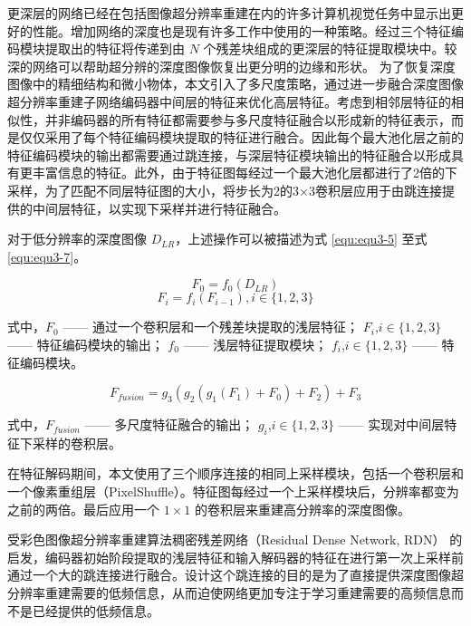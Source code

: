 更深层的网络已经在包括图像超分辨率重建在内的许多计算机视觉任务中显示出更好的性能。增加网络的深度也是现有许多工作中使用的一种策略。经过三个特征编码模块提取出的特征将传递到由 $N$ 个残差块组成的更深层的特征提取模块中。较深的网络可以帮助超分辨的深度图像恢复出更分明的边缘和形状。
\newpage
为了恢复深度图像中的精细结构和微小物体，本文引入了多尺度策略，通过进一步融合深度图像超分辨率重建子网络编码器中间层的特征来优化高层特征。考虑到相邻层特征的相似性，并非编码器的所有特征都需要参与多尺度特征融合以形成新的特征表示，而是仅仅采用了每个特征编码模块提取的特征进行融合。因此每个最大池化层之前的特征编码模块的输出都需要通过跳连接，与深层特征模块输出的特征融合以形成具有更丰富信息的特征。此外，由于特征图每经过一个最大池化层都进行了2倍的下采样，为了匹配不同层特征图的大小，将步长为2的3×3卷积层应用于由跳连接提供的中间层特征，以实现下采样并进行特征融合。

对于低分辨率的深度图像 $D_{LR}$，上述操作可以被描述为式 \ref{equ:equ3-5} 至式 \ref{equ:equ3-7}。

\begin{equation}
	F_0=f_0\left(D_{LR}\right)
	\label{equ:equ3-5}
\end{equation}
\begin{equation}
	F_i=f_i\left(F_{i-1}\right),i\in\{1,2,3\}
	\label{equ:equ3-6}
\end{equation}

\noindent 式中，$F_0$ —— 通过一个卷积层和一个残差块提取的浅层特征；\newline
\indent\quad $F_i$,$i\in\{1,2,3\}$ —— 特征编码模块的输出；\newline
\indent\quad $f_0$ —— 浅层特征提取模块；\newline
\indent\quad $f_i$,$i\in\{1,2,3\}$ —— 特征编码模块。

\begin{equation}
	F_{fusion}=g_3\left(g_2\left(g_1\left(F_1\right)+F_0\right)+F_2\right)+F_3
	\label{equ:equ3-7}
\end{equation}

\noindent 式中，$F_{fusion}$ —— 多尺度特征融合的输出；\newline
\indent\quad $g_i$,$i\in\{1,2,3\}$ —— 实现对中间层特征下采样的卷积层。

在特征解码期间，本文使用了三个顺序连接的相同上采样模块，包括一个卷积层和一个像素重组层（PixelShuffle）。特征图每经过一个上采样模块后，分辨率都变为之前的两倍。最后应用一个 $1 \times 1$ 的卷积层来重建高分辨率的深度图像。

受彩色图像超分辨率重建算法稠密残差网络（Residual Dense Network, RDN）\cite{DBLP:conf/cvpr/ZhangTKZ018} 的启发，编码器初始阶段提取的浅层特征和输入解码器的特征在进行第一次上采样前通过一个大的跳连接进行融合。设计这个跳连接的目的是为了直接提供深度图像超分辨率重建需要的低频信息，从而迫使网络更加专注于学习重建需要的高频信息而不是已经提供的低频信息。

